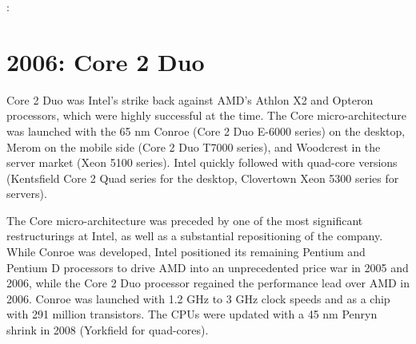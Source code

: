 :%





\hypertarget{core-2-duo}{%
\section{2006: Core 2 Duo}\label{core-2-duo}}

Core 2 Duo was Intel's strike back against AMD's Athlon X2 and Opteron
processors, which were highly successful at the time. The Core
micro-architecture was launched with the 65 nm Conroe (Core 2 Duo E-6000
series) on the desktop, Merom on the mobile side (Core 2 Duo T7000
series), and Woodcrest in the server market (Xeon 5100 series). Intel
quickly followed with quad-core versions (Kentsfield Core 2 Quad series
for the desktop, Clovertown Xeon 5300 series for servers).

The Core micro-architecture was preceded by one of the most significant
restructurings at Intel, as well as a substantial repositioning of the
company. While Conroe was developed, Intel positioned its remaining
Pentium and Pentium D processors to drive AMD into an unprecedented
price war in 2005 and 2006, while the Core 2 Duo processor regained the
performance lead over AMD in 2006. Conroe was launched with 1.2 GHz to 3
GHz clock speeds and as a chip with 291 million transistors. The CPUs
were updated with a 45 nm Penryn shrink in 2008 (Yorkfield for
quad-cores).

